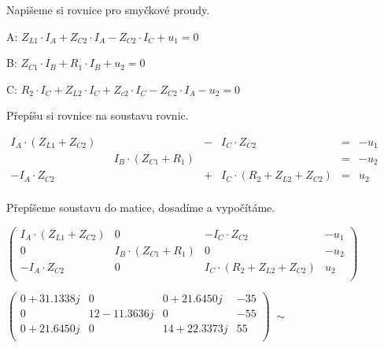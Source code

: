 \begin{large}
\vspace{1cm} \flushleft
Napišeme si rovnice pro smyčkové proudy.
\end{large}

\vspace{0.5cm}
A: $Z_{L1} \cdot I_A + Z_{C2} \cdot I_A - Z_{C2} \cdot I_C + u_1 = 0$

\vspace{0.25cm}
B: $Z_{C1} \cdot I_B + R_1 \cdot I_B + u_2 = 0$

\vspace{0.25cm}
C: $R_2 \cdot I_C + Z_{L2} \cdot I_C + Z_{c2} \cdot I_C - Z_{C2} \cdot I_A - u_2 = 0$

\begin{large}
\vspace{1cm} \flushleft
Přepíšu si rovnice na soustavu rovnic.
\end{large}

\vspace{0.5cm}
$
\begin{array}{ccccccc}
    I_A \cdot (Z_{L1} + Z_{C2}) &  &  & - & I_C \cdot Z_{C2} & = & -u_1\\
    &  & I_B \cdot (Z_{C1} + R_1) &  &  & = & -u_2\\
    -I_A \cdot Z_{C2} & & & + & I_C \cdot (R_2 + Z_{L2} + Z_{C2}) & = & u_2\\
\end{array}
$

\begin{large}
\vspace{1cm} \flushleft
Přepíšeme soustavu do matice, dosadíme a vypočítáme.
\end{large}

\vspace{0.5cm}
$
\left(
\begin{array}{ccc|c}
    I_A \cdot (Z_{L1} + Z_{C2}) & 0 & -I_C \cdot Z_{C2} & -u_1\\
    0 & I_B \cdot (Z_{C1} + R_1) & 0 & -u_2\\
    -I_A \cdot Z_{C2} & 0 & I_C \cdot (R_2 + Z_{L2} + Z_{C2}) & u_2\\
\end{array}
\right)
$

\vspace{0.5cm}
$
\left(
\begin{array}{ccc|c}
    0 + 31.1338j & 0 & 0 + 21.6450j & -35\\
    0 & 12 - 11.3636j & 0 & -55\\
    0 + 21.6450j & 0 & 14 + 22.3373j & 55\\
\end{array}
\right)
\; \sim
$

